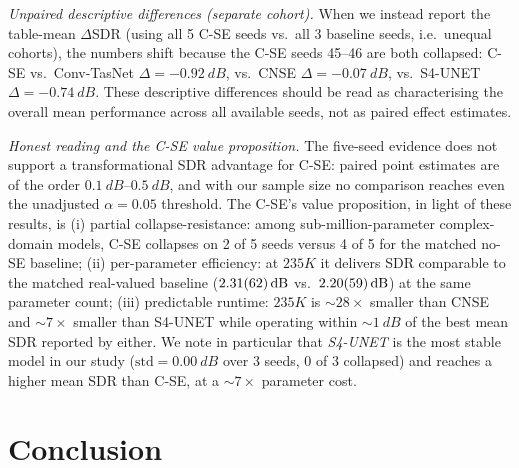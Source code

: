 \documentclass[twocolumn,english]{svjour3}
\begin{document}
\emph{Unpaired descriptive differences (separate cohort).} When we instead report the table-mean $\Delta$SDR (using all 5 C-SE seeds vs.\ all 3 baseline seeds, i.e.\ unequal cohorts), the numbers shift because the C-SE seeds 45--46 are both collapsed: C-SE vs.\ Conv-TasNet $\Delta=-\SI{0.92}{dB}$, vs.\ CNSE $\Delta=-\SI{0.07}{dB}$, vs.\ S4-UNET $\Delta=-\SI{0.74}{dB}$. These descriptive differences should be read as characterising the overall mean performance across all available seeds, not as paired effect estimates.

\emph{Honest reading and the C-SE value proposition.} The five-seed evidence does not support a transformational SDR advantage for C-SE: paired point estimates are of the order $\SI{0.1}{dB}$--$\SI{0.5}{dB}$, and with our sample size no comparison reaches even the unadjusted $\alpha=0.05$ threshold. The C-SE's value proposition, in light of these results, is (i) partial collapse-resistance: among sub-million-parameter complex-domain models, C-SE collapses on 2 of 5 seeds versus 4 of 5 for the matched no-SE baseline; (ii) per-parameter efficiency: at $235K$ it delivers SDR comparable to the matched real-valued baseline ($\SI{2.31 \pm 0.62}{dB}$ vs.\ $\SI{2.20 \pm 0.59}{dB}$) at the same parameter count; (iii) predictable runtime: $235K$ is $\sim 28\times$ smaller than CNSE and $\sim 7\times$ smaller than S4-UNET while operating within $\sim\SI{1}{dB}$ of the best mean SDR reported by either. We note in particular that \emph{S4-UNET} is the most stable model in our study ($\text{std}=\SI{0.00}{dB}$ over 3 seeds, 0 of 3 collapsed) and reaches a higher mean SDR than C-SE, at a $\sim 7\times$ parameter cost.

\section{Conclusion}
\label{sec:conclusion}
\end{document}
